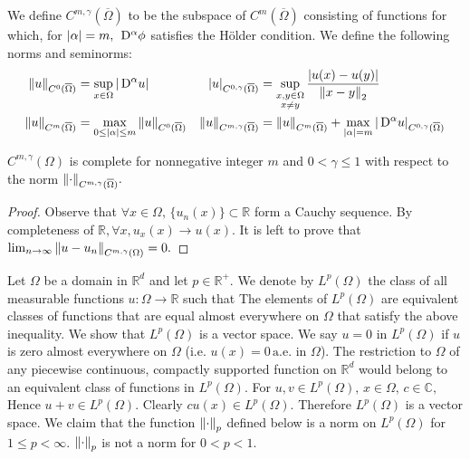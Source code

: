 We define $C^{m,\gamma}(\overline{\Omega})$ to be the subspace of $C^m(\overline{\Omega})$ consisting of functions for which, for $\abs{\alpha}=m,$ $\,\mathrm{D}^\alpha\phi$ satisfies the H\"older condition. We define the following norms and seminorms:
\begin{align}
    \norm{u}_{C^0(\overline{\Omega})} &= \sup_{x\in\Omega}\abs{\,\mathrm{D}^\alpha u}
    &
    \abs{u}_{C^{0,\gamma}(\overline{\Omega})} &= \sup_{\substack{x,y\in\Omega\\x\neq y}}\frac{\abs{u(x)-u(y)}}{\norm{x-y}_2}
    \\
    \norm{u}_{C^{m}(\overline{\Omega})} &= \max_{0\leq\abs{\alpha}\leq m}\norm{u}_{C^0(\overline{\Omega})}
    &
    \norm{u}_{C^{m,\gamma}(\overline{\Omega})} &= \norm{u}_{C^m(\overline{\Omega})}+\max_{\abs{\alpha}=m}\abs{\,\mathrm{D}^\alpha u}_{C^{0,\gamma}(\overline{\Omega})}
\end{align}
\begin{theorem}
    $C^{m,\gamma}(\Omega)$ is complete for nonnegative integer $m$ and $0<\gamma\leq1$ with respect to the norm $\norm{\cdot}_{C^{m,\gamma}(\overline{\Omega})}.$
\end{theorem}
\begin{proof}
    Observe that $\forall x\in\Omega,\,\{u_n(x)\}\subset\mathbb{R}$ form a Cauchy sequence. By completeness of $\mathbb{R},\forall x, u_x(x)\rightarrow u(x).$ It is left to prove that $\lim_{n\rightarrow\infty}\norm{u-u_n}_{C^{m,\gamma}(\Omega)}=0.$
\end{proof}
Let $\Omega$ be a domain in $\mathbb{R}^d$ and let $p\in\mathbb{R}^+.$ We denote by $L^p(\Omega)$ the class of all measurable functions $u:\Omega\rightarrow\mathbb{R}$ such that
The elements of $L^p(\Omega)$ are equivalent classes of functions that are equal almost everywhere on $\Omega$ that satisfy the above inequality. We show that $L^p(\Omega)$ is a vector space. We say $u=0$ in $L^p(\Omega)$ if $u$ is zero almost everywhere on $\Omega$ (i.e. $u(x)=0\,\mathrm{a.e.}$ in $\Omega$). The restriction to $\Omega$ of any piecewise continuous, compactly supported function on $\mathbb{R}^d$ would belong to an equivalent class of functions in $L^p(\Omega).$ For $u,v\in L^p(\Omega),\,x\in\Omega,\,c\in\mathbb{C},$
Hence $u+v\in L^p(\Omega).$ Clearly $cu(x)\in L^p(\Omega).$ Therefore $L^p(\Omega)$ is a vector space. We claim that the function $\norm{\cdot}_p$ defined below is a norm on $L^p(\Omega)$ for $1\leq p<\infty.$ $\norm{\cdot}_p$ is not a norm for $0<p<1.$
